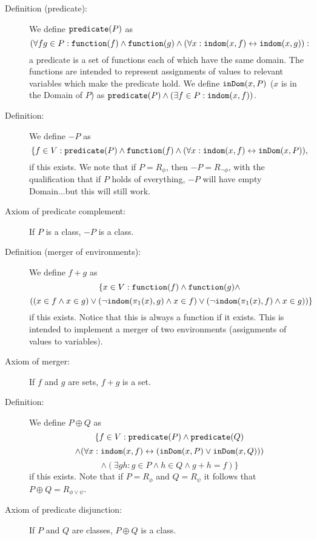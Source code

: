 \documentclass[12pt]{article}
\begin{document}
\begin{description}

\item[Definition (predicate):]  We define ${\tt predicate}(P)$ as $$(\forall fg \in P:{\tt function}(f) \wedge {\tt function}(g) \wedge (\forall x:{\tt indom}(x,f) \leftrightarrow {\tt indom}(x,g)):$$  a predicate is a set of functions each of which have the same domain.  The functions are intended to represent assignments of values to relevant variables which make the predicate hold.  We define ${\tt inDom}(x,P)$ ($x$ is in the Domain of $P$) as ${\tt predicate}(P) \wedge (\exists f\in P:{\tt indom}(x,f))$.



\item[Definition:]  We define $-P$ as $$\{f \in V:{\tt predicate}(P) \wedge {\tt function}(f) \wedge (\forall x:{\tt indom}(x,f)\leftrightarrow {\tt inDom}(x,P)),$$ if this exists. We note that if $P = R_\phi$, then $-P = R_{\neg\phi}$, with the qualification that if $P$ holds of everything, $-P$ will have empty Domain...but this will still work.

\item[Axiom of predicate complement:]  If $P$ is a class, $-P$ is a class.

\item[Definition (merger of environments):]  We define $f+g$ as $$\{x \in V:{\tt function}(f) \wedge {\tt function}(g) \wedge $$ $$((x \in f \wedge x \in g) \vee (\neg {\tt indom}(\pi_1(x),g) \wedge x \in f) \vee (\neg {\tt indom}(\pi_1(x),f) \wedge x \in g))\}$$ if this exists.  Notice that this is always a function if it exists.  This is intended to implement a merger of two environments (assignments of values to variables).

\item[Axiom of merger:]  If $f$ and $g$ are sets, $f+g$ is a set.

\item[Definition:]  We define $P \oplus Q$ as $$\{f \in V:{\tt predicate}(P) \wedge {\tt predicate}(Q) $$ $$\wedge (\forall x:{\tt indom}(x,f) \leftrightarrow ({\tt inDom}(x,P) \vee {\tt inDom}(x,Q))) $$ $$\wedge (\exists gh:g \in P \wedge h \in Q \wedge g+h = f)\}$$ if this exists.  Note that if $P = R_\phi$ and $Q = R_{\psi}$ it follows that $P \oplus Q = R_{\phi \vee \psi}$.

\item[Axiom of predicate disjunction:]  If $P$ and $Q$ are classes, $P \oplus Q$ is a class.


\end{description}
\end{document}
